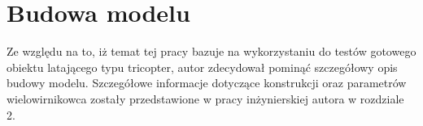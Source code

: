 \section{Budowa modelu}
Ze względu na to, iż temat tej pracy bazuje na wykorzystaniu do testów gotowego obiektu latającego typu tricopter, autor zdecydował pominąć szczegółowy opis budowy modelu.
Szczegółowe informacje dotyczące konstrukcji oraz parametrów wielowirnikowca zostały przedstawione w pracy inżynierskiej autora w rozdziale 2. %



